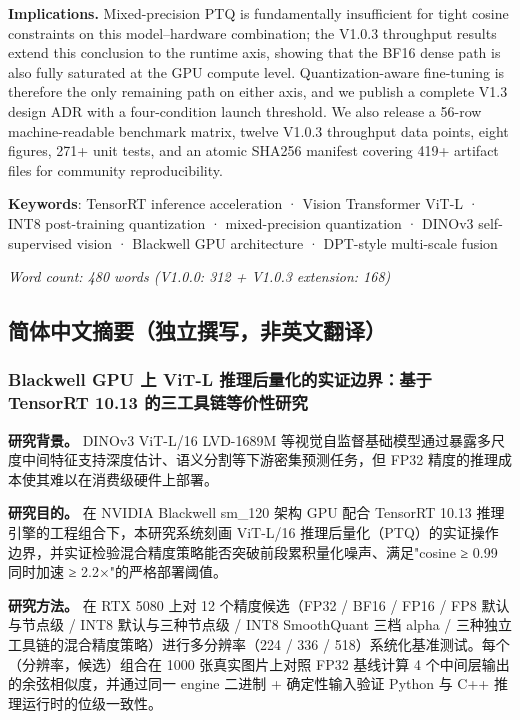 \documentclass[
]{article}
\begin{document}
\textbf{Implications.} Mixed-precision PTQ is fundamentally insufficient
for tight cosine constraints on this model--hardware combination; the
V1.0.3 throughput results extend this conclusion to the runtime axis,
showing that the BF16 dense path is also fully saturated at the GPU
compute level. Quantization-aware fine-tuning is therefore the only
remaining path on either axis, and we publish a complete V1.3 design ADR
with a four-condition launch threshold. We also release a 56-row
machine-readable benchmark matrix, twelve V1.0.3 throughput data points,
eight figures, 271+ unit tests, and an atomic SHA256 manifest covering
419+ artifact files for community reproducibility.

\textbf{Keywords}: TensorRT inference acceleration · Vision Transformer
ViT-L · INT8 post-training quantization · mixed-precision quantization ·
DINOv3 self-supervised vision · Blackwell GPU architecture · DPT-style
multi-scale fusion

\emph{Word count: 480 words (V1.0.0: 312 + V1.0.3 extension: 168)}

\subsection{简体中文摘要（独立撰写，非英文翻译）}\label{ux7b80ux4f53ux4e2dux6587ux6458ux8981ux72ecux7acbux64b0ux5199ux975eux82f1ux6587ux7ffbux8bd1}

\subsubsection{Blackwell GPU 上 ViT-L 推理后量化的实证边界：基于
TensorRT 10.13
的三工具链等价性研究}\label{blackwell-gpu-ux4e0a-vit-l-ux63a8ux7406ux540eux91cfux5316ux7684ux5b9eux8bc1ux8fb9ux754cux57faux4e8e-tensorrt-1013-ux7684ux4e09ux5de5ux5177ux94feux7b49ux4ef7ux6027ux7814ux7a76}

\textbf{研究背景。} DINOv3 ViT-L/16 LVD-1689M
等视觉自监督基础模型通过暴露多尺度中间特征支持深度估计、语义分割等下游密集预测任务，但
FP32 精度的推理成本使其难以在消费级硬件上部署。

\textbf{研究目的。} 在 NVIDIA Blackwell sm\_120 架构 GPU 配合 TensorRT
10.13 推理引擎的工程组合下，本研究系统刻画 ViT-L/16
推理后量化（PTQ）的实证操作边界，并实证检验混合精度策略能否突破前段累积量化噪声、满足"cosine
≥ 0.99 同时加速 ≥ 2.2×"的严格部署阈值。

\textbf{研究方法。} 在 RTX 5080 上对 12 个精度候选（FP32 / BF16 / FP16 /
FP8 默认与节点级 / INT8 默认与三种节点级 / INT8 SmoothQuant 三档 alpha /
三种独立工具链的混合精度策略）进行多分辨率（224 / 336 /
518）系统化基准测试。每个（分辨率，候选）组合在 1000 张真实图片上对照
FP32 基线计算 4 个中间层输出的余弦相似度，并通过同一 engine 二进制 +
确定性输入验证 Python 与 C++ 推理运行时的位级一致性。
\end{document}
